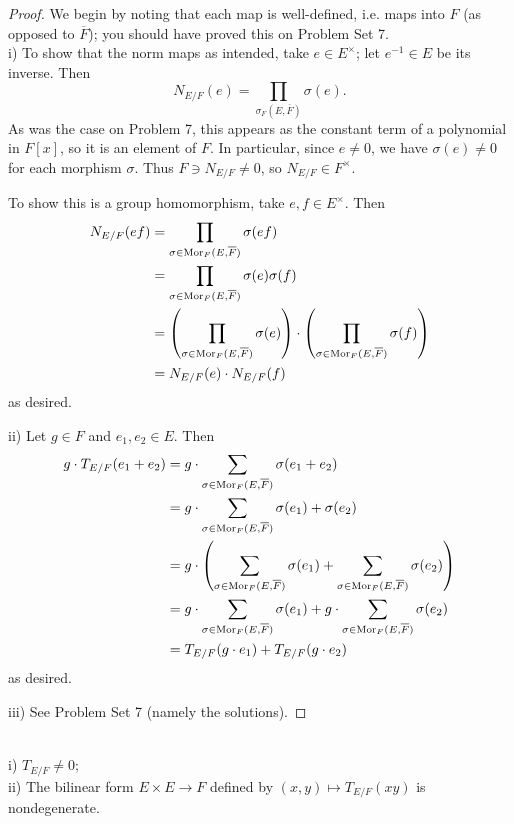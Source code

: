 \begin{proof}
	We begin by noting that each map is well-defined, i.e. maps into $F$ (as opposed to $\overline{F}$); you should have proved this on Problem Set 7. \\
	i) To show that the norm maps as intended, take $e \in E^{\times}$; let $e^{-1} \in E$ be its inverse. Then 
		\[N_{E/F}(e) = \prod_{\sigma_F(E, \overline{F})} \sigma(e).\]
	As was the case on Problem 7, this appears as the constant term of a polynomial in $F[x]$, so it is an element of $F$. In particular, since $e \neq 0$, we have $\sigma(e) \neq 0$ for each morphism $\sigma$. Thus $F \ni N_{E/F} \neq 0$, so $N_{E/F} \in F^{\times}$.
	
	To show this is a group homomorphism, take $e, f \in E^{\times}$. Then
		\begin{align*}
			N_{E/F}(ef) &= \prod_{\sigma \in \operatorname{Mor}_F(E, \overline{F})} \sigma(ef) \\
			&= \prod_{\sigma \in \operatorname{Mor}_F(E, \overline{F})} \sigma(e)\sigma(f) \\
			&= \left( \prod_{\sigma \in \operatorname{Mor}_F(E, \overline{F})} \sigma(e) \right) \cdot \left( \prod_{\sigma \in \operatorname{Mor}_F(E, \overline{F})} \sigma(f) \right) \\
			&= N_{E/F}(e) \cdot N_{E/F}(f)
		\end{align*}
	as desired.
	
	ii) Let $g \in F$ and $e_1, e_2 \in E$. Then
		\begin{align*}
			g \cdot T_{E/F}(e_1 + e_2) &= g \cdot \sum_{\sigma \in \operatorname{Mor}_F(E, \overline{F})} \sigma(e_1 + e_2) \\
			&= g \cdot \sum_{\sigma \in \operatorname{Mor}_F(E, \overline{F})} \sigma(e_1) + \sigma(e_2) \\
			&= g \cdot \left( \sum_{\sigma \in \operatorname{Mor}_F(E, \overline{F})} \sigma(e_1) + \sum_{\sigma \in \operatorname{Mor}_F(E, \overline{F})} \sigma(e_2) \right) \\
			&= g \cdot \sum_{\sigma \in \operatorname{Mor}_F(E, \overline{F})} \sigma(e_1) + g \cdot \sum_{\sigma \in \operatorname{Mor}_F(E, \overline{F})} \sigma(e_2) \\
			&= T_{E/F}(g \cdot e_1) + T_{E/F}(g \cdot e_2)
		\end{align*}
		as desired.
		
		iii) See Problem Set 7 (namely the solutions).
\end{proof}

\begin{fact}
	~\\
	i) $T_{E/F} \neq 0$; \\
	ii) The bilinear form $E \times E \rightarrow F$ defined by $(x, y) \mapsto T_{E/F}(xy)$ is nondegenerate.
\end{fact}


